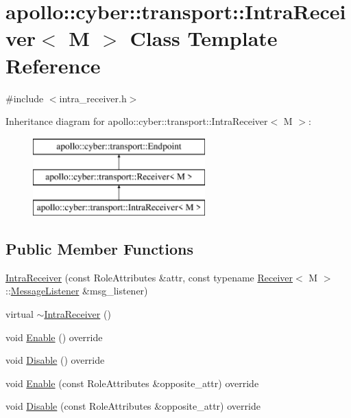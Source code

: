\hypertarget{classapollo_1_1cyber_1_1transport_1_1IntraReceiver}{\section{apollo\-:\-:cyber\-:\-:transport\-:\-:Intra\-Receiver$<$ M $>$ Class Template Reference}
\label{classapollo_1_1cyber_1_1transport_1_1IntraReceiver}
}


{\ttfamily \#include $<$intra\-\_\-receiver.\-h$>$}

Inheritance diagram for apollo\-:\-:cyber\-:\-:transport\-:\-:Intra\-Receiver$<$ M $>$\-:\begin{figure}[H]
\begin{center}
\leavevmode
\includegraphics[height=3.000000cm]{classapollo_1_1cyber_1_1transport_1_1IntraReceiver}
\end{center}
\end{figure}
\subsection*{Public Member Functions}
\begin{DoxyCompactItemize}
\item 
\hyperlink{classapollo_1_1cyber_1_1transport_1_1IntraReceiver_a29c01b845450c6bb165d370c971f8609}{Intra\-Receiver} (const Role\-Attributes \&attr, const typename \hyperlink{classapollo_1_1cyber_1_1transport_1_1Receiver}{Receiver}$<$ M $>$\-::\hyperlink{classapollo_1_1cyber_1_1transport_1_1Receiver_abd906fd03582b49acbdc81b48a8974aa}{Message\-Listener} \&msg\-\_\-listener)
\item 
virtual \hyperlink{classapollo_1_1cyber_1_1transport_1_1IntraReceiver_a196c34905f08a271ef54495995fa4d6c}{$\sim$\-Intra\-Receiver} ()
\item 
void \hyperlink{classapollo_1_1cyber_1_1transport_1_1IntraReceiver_a34ff25c3a402ac5d04bd4b95fe1caee5}{Enable} () override
\item 
void \hyperlink{classapollo_1_1cyber_1_1transport_1_1IntraReceiver_a6737814d7652ca2272f4099cbafc33a1}{Disable} () override
\item 
void \hyperlink{classapollo_1_1cyber_1_1transport_1_1IntraReceiver_ae99f0f99dbd6de9b4c3a5ca443d8dd13}{Enable} (const Role\-Attributes \&opposite\-\_\-attr) override
\item 
void \hyperlink{classapollo_1_1cyber_1_1transport_1_1IntraReceiver_a51d5d2db5cc14599160a6192790a1296}{Disable} (const Role\-Attributes \&opposite\-\_\-attr) override
\end{DoxyCompactItemize}

